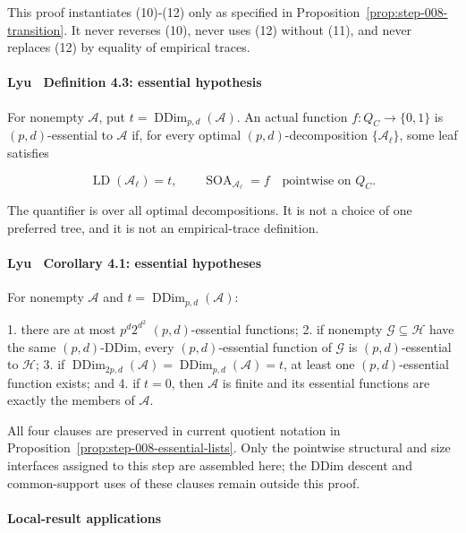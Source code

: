 This proof instantiates (10)-(12) only as specified in
Proposition~\ref{prop:step-008-transition}. It never reverses (10), never
uses (12) without (11), and never replaces (12) by equality of empirical
traces.

\paragraph{Lyu~\citep{lyu2025} Definition 4.3: essential hypothesis}

For nonempty \(\mathcal A\), put
\(t=\operatorname{DDim}_{p,d}(\mathcal A)\). An actual function
\(f:Q_C\to\{0,1\}\) is \((p,d)\)-essential to \(\mathcal A\) if, for every
optimal \((p,d)\)-decomposition \(\{\mathcal A_\ell\}\), some leaf satisfies

\[
 \operatorname{LD}(\mathcal A_\ell)=t,
 \qquad
 \operatorname{SOA}_{\mathcal A_\ell}=f
 \quad\text{pointwise on }Q_C.
\tag{13}
\]

The quantifier is over all optimal decompositions. It is not a choice of
one preferred tree, and it is not an empirical-trace definition.

\paragraph{Lyu~\citep{lyu2025} Corollary 4.1: essential hypotheses}

For nonempty \(\mathcal A\) and
\(t=\operatorname{DDim}_{p,d}(\mathcal A)\):

1. there are at most \(p^d2^{d^2}\) \((p,d)\)-essential functions;
2. if nonempty \(\mathcal G\subseteq\mathcal H\) have the same
   \((p,d)\)-DDim, every \((p,d)\)-essential function of \(\mathcal G\)
   is \((p,d)\)-essential to \(\mathcal H\);
3. if
   \(\operatorname{DDim}_{2p,d}(\mathcal A)
     =\operatorname{DDim}_{p,d}(\mathcal A)=t\),
   at least one \((p,d)\)-essential function exists; and
4. if \(t=0\), then \(\mathcal A\) is finite and its essential functions
   are exactly the members of \(\mathcal A\).

All four clauses are preserved in current quotient notation in
Proposition~\ref{prop:step-008-essential-lists}. Only the pointwise
structural and size interfaces assigned to this step are assembled here;
the DDim descent and common-support uses of these clauses remain outside
this proof.

\paragraph{Local-result applications}

